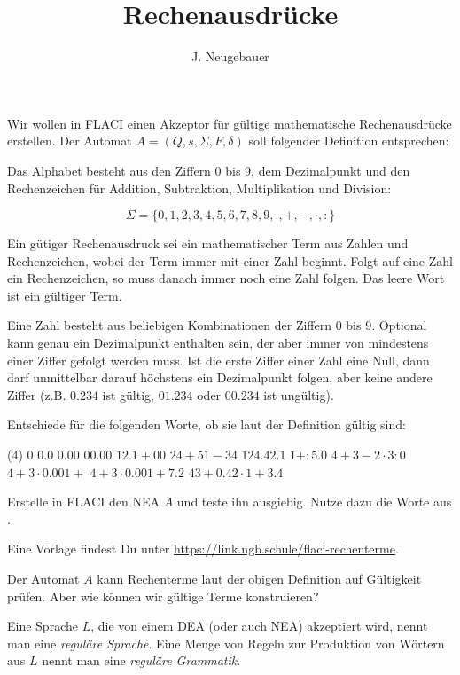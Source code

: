 \documentclass[10pt, a4paper]{scrartcl}
\author{J. Neugebauer}
\title{Rechenausdrücke}
\date{\Heute}
\begin{document}
\ReiheTitel

Wir wollen in FLACI einen Akzeptor für gültige mathematische Rechenausdrücke erstellen. Der Automat $A = (Q, s, \Sigma, F, \delta)$ soll folgender Definition entsprechen:

Das Alphabet besteht aus den Ziffern 0 bis 9, dem Dezimalpunkt und den Rechenzeichen für Addition, Subtraktion, Multiplikation und Division:

\[ \Sigma = \{0,1,2,3,4,5,6,7,8,9,.,+,-,\cdot,:\} \]

Ein gütiger Rechenausdruck sei ein mathematischer Term aus Zahlen und Rechenzeichen, wobei der Term immer mit einer Zahl beginnt. Folgt auf eine Zahl ein Rechenzeichen, so muss danach immer noch eine Zahl folgen. Das leere Wort ist ein gültiger Term.

Eine Zahl besteht aus beliebigen Kombinationen der Ziffern 0 bis 9. Optional kann genau ein Dezimalpunkt enthalten sein, der aber immer von mindestens einer Ziffer gefolgt werden muss. Ist die erste Ziffer einer Zahl eine Null, dann darf unmittelbar darauf höchstens ein Dezimalpunkt folgen, aber keine andere Ziffer (z.B. $0.234$ ist gültig, $01.234$ oder $00.234$ ist ungültig).

\begin{aufgabe}\label{aufg:worte}
	Entschiede für die folgenden Worte, ob sie laut der Definition gültig sind:
	
	\begin{tasks}(4)
		\task $0$
		\task $0.0$
		\task $0.00$
		\task $00.00$
		\task $12.1+00$
		\task $24+51-34$
		\task $124.42.1$
		\task $1+:5.0$
		\task $4+3-2\cdot3:0$
		\task $4+3\cdot0.001+$
		\task $4+3\cdot0.001+7.2$
		\task $43+0.42\cdot1+3.4$
	\end{tasks}
\end{aufgabe}

\begin{aufgabe}
	Erstelle in FLACI den NEA $A$ und teste ihn ausgiebig. Nutze dazu die Worte aus .
	
	Eine Vorlage findest Du unter \url{https://link.ngb.schule/flaci-rechenterme}.
\end{aufgabe}

\linie[\textwidth]

Der Automat $A$ kann Rechenterme laut der obigen Definition auf Gültigkeit prüfen. Aber wie können wir gültige Terme konstruieren?

Eine Sprache $L$, die von einem DEA (oder auch NEA) akzeptiert wird, nennt man eine \emph{reguläre Sprache}. Eine Menge von Regeln zur Produktion von Wörtern aus $L$ nennt man eine \emph{reguläre Grammatik}.
\end{document}
